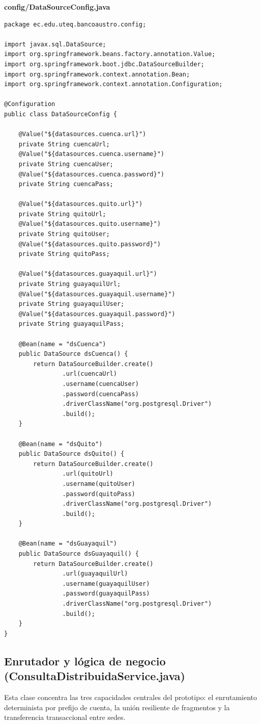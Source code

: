 \documentclass[11pt,a4paper]{article}
\newcommand{\codecaption}[1]{{\ttfamily\small\bfseries\color{acento} #1}\par\vspace{2pt}}
\begin{document}
\codecaption{config/DataSourceConfig.java}
\begin{lstlisting}[style=java]
package ec.edu.uteq.bancoaustro.config;

import javax.sql.DataSource;
import org.springframework.beans.factory.annotation.Value;
import org.springframework.boot.jdbc.DataSourceBuilder;
import org.springframework.context.annotation.Bean;
import org.springframework.context.annotation.Configuration;

@Configuration
public class DataSourceConfig {

    @Value("${datasources.cuenca.url}")
    private String cuencaUrl;
    @Value("${datasources.cuenca.username}")
    private String cuencaUser;
    @Value("${datasources.cuenca.password}")
    private String cuencaPass;

    @Value("${datasources.quito.url}")
    private String quitoUrl;
    @Value("${datasources.quito.username}")
    private String quitoUser;
    @Value("${datasources.quito.password}")
    private String quitoPass;

    @Value("${datasources.guayaquil.url}")
    private String guayaquilUrl;
    @Value("${datasources.guayaquil.username}")
    private String guayaquilUser;
    @Value("${datasources.guayaquil.password}")
    private String guayaquilPass;

    @Bean(name = "dsCuenca")
    public DataSource dsCuenca() {
        return DataSourceBuilder.create()
                .url(cuencaUrl)
                .username(cuencaUser)
                .password(cuencaPass)
                .driverClassName("org.postgresql.Driver")
                .build();
    }

    @Bean(name = "dsQuito")
    public DataSource dsQuito() {
        return DataSourceBuilder.create()
                .url(quitoUrl)
                .username(quitoUser)
                .password(quitoPass)
                .driverClassName("org.postgresql.Driver")
                .build();
    }

    @Bean(name = "dsGuayaquil")
    public DataSource dsGuayaquil() {
        return DataSourceBuilder.create()
                .url(guayaquilUrl)
                .username(guayaquilUser)
                .password(guayaquilPass)
                .driverClassName("org.postgresql.Driver")
                .build();
    }
}
\end{lstlisting}

\subsection{Enrutador y lógica de negocio (ConsultaDistribuidaService.java)}
Esta clase concentra las tres capacidades centrales del prototipo: el enrutamiento determinista por prefijo de cuenta, la unión resiliente de fragmentos y la transferencia transaccional entre sedes.
\end{document}
